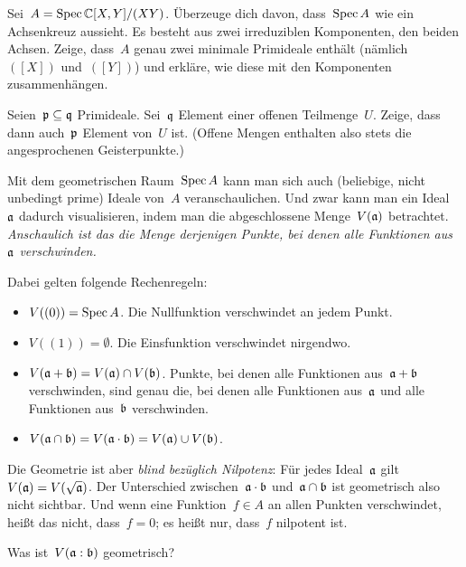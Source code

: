 \documentclass{uebblatt}
\begin{document}
\begin{fun}Sei~$A = \operatorname{Spec} \mathbb{C}[X,Y]/(XY)$. Überzeuge dich davon, dass~$\operatorname{Spec} A$
wie ein Achsenkreuz aussieht. Es besteht aus zwei irreduziblen Komponenten, den
beiden Achsen. Zeige, dass~$A$ genau zwei minimale Primideale enthält
(nämlich~$([X])$ und~$([Y])$) und erkläre, wie diese mit den Komponenten
zusammenhängen.
\end{fun}

\begin{fun}Seien~$\mathfrak{p} \subseteq \mathfrak{q}$ Primideale. Sei~$\mathfrak{q}$ Element einer
offenen Teilmenge~$U$. Zeige, dass dann auch~$\mathfrak{p}$ Element von~$U$ ist.
(Offene Mengen enthalten also stets die angesprochenen Geisterpunkte.)
\end{fun}

Mit dem geometrischen Raum~$\operatorname{Spec} A$ kann man sich auch (beliebige, nicht
unbedingt prime) Ideale von~$A$ veranschaulichen. Und zwar kann man ein
Ideal~$\mathfrak{a}$ dadurch visualisieren, indem man die abgeschlossene
Menge~$V(\mathfrak{a})$ betrachtet. \emph{Anschaulich ist das die Menge derjenigen
Punkte, bei denen alle Funktionen aus~$\mathfrak{a}$ verschwinden.}

Dabei gelten folgende Rechenregeln:

\begin{itemize}
\item $V((0)) = \operatorname{Spec} A$. Die Nullfunktion verschwindet an jedem Punkt.
\item $V((1)) = \emptyset$. Die Einsfunktion verschwindet nirgendwo.
\item $V(\mathfrak{a} + \mathfrak{b}) = V(\mathfrak{a}) \cap V(\mathfrak{b})$. Punkte, bei denen alle
Funktionen aus~$\mathfrak{a} + \mathfrak{b}$ verschwinden, sind genau die, bei denen alle
Funktionen aus~$\mathfrak{a}$ und alle Funktionen aus~$\mathfrak{b}$ verschwinden.
\item $V(\mathfrak{a} \cap \mathfrak{b}) = V(\mathfrak{a} \cdot \mathfrak{b}) = V(\mathfrak{a}) \cup V(\mathfrak{b})$.
\end{itemize}

Die Geometrie ist aber \emph{blind bezüglich Nilpotenz}: Für jedes Ideal~$\mathfrak{a}$
gilt~$V(\mathfrak{a}) = V(\sqrt{\mathfrak{a}})$. Der Unterschied zwischen~$\mathfrak{a} \cdot \mathfrak{b}$
und~$\mathfrak{a} \cap \mathfrak{b}$ ist geometrisch also nicht sichtbar.
Und wenn eine Funktion~$f \in A$ an allen Punkten verschwindet, heißt das
nicht, dass~$f = 0$; es heißt nur, dass~$f$ nilpotent ist.

\begin{fun}Was ist~$V(\mathfrak{a} : \mathfrak{b})$ geometrisch?\end{fun}
\end{document}
